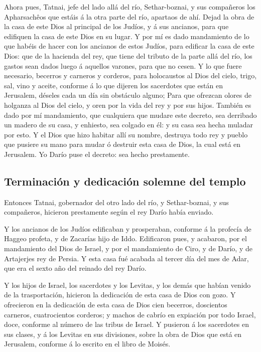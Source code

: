  Ahora pues, Tatnai, jefe del lado allá del río,
Sethar-boznai, y sus compañeros los Apharsachêos que estáis á la otra
parte del río, apartaos de ahí.  Dejad la obra de la casa
de este Dios al principal de los Judíos, y á sus ancianos, para que
edifiquen la casa de este Dios en su lugar.  Y por mí es
dado mandamiento de lo que habéis de hacer con los ancianos de estos
Judíos, para edificar la casa de este Dios: que de la hacienda del rey,
que tiene del tributo de la parte allá del río, los gastos sean dados
luego á aquellos varones, para que no cesen.  Y lo que
fuere necesario, becerros y carneros y corderos, para holocaustos al
Dios del cielo, trigo, sal, vino y aceite, conforme á lo que dijeren los
sacerdotes que están en Jerusalem, déseles cada un día sin obstáculo
alguno;  Para que ofrezcan olores de holganza al Dios del
cielo, y oren por la vida del rey y por sus hijos. 
También es dado por mí mandamiento, que cualquiera que mudare este
decreto, sea derribado un madero de su casa, y enhiesto, sea colgado en
él: y su casa sea hecha muladar por esto.  Y el Dios que
hizo habitar allí su nombre, destruya todo rey y pueblo que pusiere su
mano para mudar ó destruir esta casa de Dios, la cual está en Jerusalem.
Yo Darío puse el decreto: sea hecho prestamente.

\hypertarget{terminaciuxf3n-y-dedicaciuxf3n-solemne-del-templo}{%
\subsection{Terminación y dedicación solemne del
templo}\label{terminaciuxf3n-y-dedicaciuxf3n-solemne-del-templo}}

 Entonces Tatnai, gobernador del otro lado del río, y
Sethar-boznai, y sus compañeros, hicieron prestamente según el rey Darío
había enviado.

 Y los ancianos de los Judíos edificaban y prosperaban,
conforme á la profecía de Haggeo profeta, y de Zacarías hijo de Iddo.
Edificaron pues, y acabaron, por el mandamiento del Dios de Israel, y
por el mandamiento de Ciro, y de Darío, y de Artajerjes rey de Persia.
 Y esta casa fué acabada al tercer día del mes de Adar,
que era el sexto año del reinado del rey Darío.

 Y los hijos de Israel, los sacerdotes y los Levitas, y
los demás que habían venido de la trasportación, hicieron la dedicación
de esta casa de Dios con gozo.  Y ofrecieron en la
dedicación de esta casa de Dios cien becerros, doscientos carneros,
cuatrocientos corderos; y machos de cabrío en expiación por todo Israel,
doce, conforme al número de las tribus de Israel.  Y
pusieron á los sacerdotes en sus clases, y á los Levitas en sus
divisiones, sobre la obra de Dios que está en Jerusalem, conforme á lo
escrito en el libro de Moisés.

